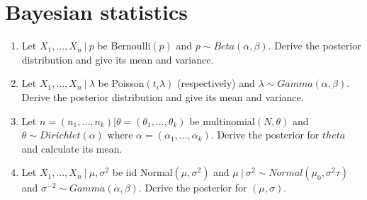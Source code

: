 \documentclass[12pt]{article}
\begin{document}
\section{Bayesian statistics}
\begin{enumerate}
\item Let $X_1,\ldots, X_n ~|~ p$ be Bernoulli$(p)$ and $p \sim Beta(\alpha, \beta)$. Derive the posterior
  distribution and give its mean and variance.
\item Let $X_1,\ldots, X_n ~|~ \lambda$ be Poisson$(t_i\lambda)$ (respectively) and $\lambda \sim Gamma(\alpha, \beta)$.
  Derive the posterior distribution and give its mean and variance.
\item Let $n = (n_1,\ldots, n_k) | \theta = (\theta_1, \ldots, \theta_k)$ be multinomial$(N, \theta)$ and $\theta \sim Dirichlet(\alpha)$
where $\alpha = (\alpha_1,\ldots,\alpha_k)$. Derive the posterior for $theta$ and calculate its mean.
\item Let $X_1,\ldots, X_n ~|~ \mu, \sigma^2$ be iid Normal$(\mu, \sigma^2)$ and $\mu ~|~ \sigma^2 \sim Normal(\mu_0, \sigma^2 \tau)$
and $\sigma^{-2} \sim Gamma(\alpha, \beta)$. Derive the posterior for $(\mu,\sigma)$. 
\end{enumerate}

\end{document}
